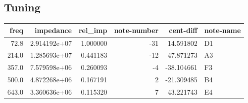 \documentclass{article}
\begin{document}
\subsection{Tuning}
\begin{centering}
\begin{tabular}{rrrrrl}
\toprule
 freq &    impedance &  rel\_imp &  note-number &  cent-diff & note-name \\
\midrule
 72.8 & 2.914192e+07 & 1.000000 &          -31 &  14.591802 &        D1 \\
214.0 & 1.285693e+07 & 0.441183 &          -12 &  47.871273 &        A3 \\
357.0 & 7.579598e+06 & 0.260093 &           -4 & -38.104661 &        F3 \\
500.0 & 4.872268e+06 & 0.167191 &            2 & -21.309485 &        B4 \\
643.0 & 3.360636e+06 & 0.115320 &            7 &  43.221743 &        E4 \\
\bottomrule
\end{tabular}
\end{centering}
\end{document}
